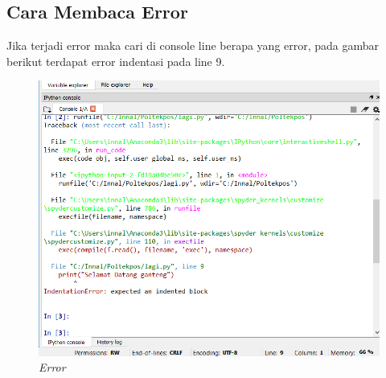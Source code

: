 \subsection{Cara Membaca Error}
Jika terjadi error maka cari di console line berapa yang error, pada gambar berikut terdapat error indentasi pada line 9.
\begin{figure}[H]
    \centering
    \includegraphics[scale=0.4]{figures/errorindentasi}
    \caption{\textit{Error}}
    \label{Error}
\end{figure}

